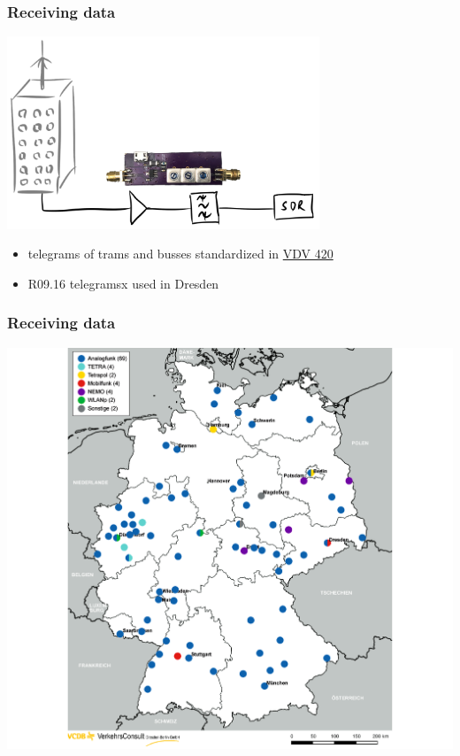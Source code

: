 \documentclass[aspectratio=169]{beamer}
\begin{document}

\begin{frame}
\frametitle{Receiving data}
\centering
\includegraphics[width=0.7\textwidth]{figs/antenna-filter.pdf}
\end{frame}


\begin{frame}
	\begin{itemize}
	\item telegrams of trams and busses standardized in \href{https://knowhow.vdv.de/documents/420/}{VDV 420}
	\item R09.16 telegramsx used in Dresden
	\end{itemize}
\end{frame}


\begin{frame}
\frametitle{Receiving data}
\centering

\includegraphics[height=0.8\textheight]{figs/vcdb-map-ampelbeeinflussung.png}
\end{frame}
\end{document}
